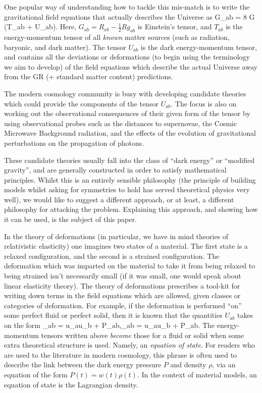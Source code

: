 One popular way of understanding how to tackle this mis-match is to write the gravitational field equations that actually describes the Universe as
\bea
G_{ab} = 8 \pi G \left(T_{ab} + U_{ab}\right).
\eea
Here, $G_{ab} = R_{ab} - \tfrac{1}{2}Rg_{ab}$ is Einstein's tensor, and $T_{ab}$ is the energy-momentum tensor of all \textit{known} matter sources (such as radiation, baryonic, and dark matter).
The tensor $U_{ab}$ is the dark energy-momentum tensor, and contains all the deviations or deformations (to begin using the terminology we aim to develop) of the field equations which describe the actual Universe away from the GR (+ standard matter content) predictions. 

The modern cosmology community is busy with developing candidate theories which could provide the components of the tensor $U_{ab}$. The focus is also on working out the observational consequences of their given form of the tensor by using observational probes such as the distances to supernovae, the Cosmic Microwave Background radiation, and the effects of the evolution of gravitational perturbations on the propagation of photons.  

These candidate theories usually fall into the class of ``dark energy'' or ``modified gravity'', and are generally constructed in order to satisfy mathematical principles. Whilst this is an entirely sensible philosophy (the principle of building models whilst asking for symmetries to hold has served theoretical physics very well), we  would like to suggest a different approach, or at least, a different philosophy for attacking the problem. Explaining this approach, and showing how it can be used, is the subject of this paper.

In the theory of deformations (in particular, we have in mind   theories of relativistic elasticity) one imagines two states of a material. The first state is a relaxed configuration, and the second is a strained configuration. The deformation which was imparted on the material to take it from being relaxed to being strained isn't necessarily small (if it was small, one would  speak about linear elasticity theory). The theory of deformations prescribes a tool-kit for writing down terms in the field equations which are allowed, given classes or categories of deformation. For example, if the deformation is performed ``on'' some perfect fluid or perfect solid, then it is known that the quantities $U_{ab}$ takes on the form
\bea
{}_{ab} = \rho u_au_b + P\gamma_{ab},\qquad {}_{ab} = \rho u_au_b + P_{ab}.
\eea
The energy-momentum tensors written above \textit{become} those for a fluid or solid when some extra theoretical structure is used. Namely, an \textit{equation of state}. For readers who are used to the literature in modern cosmology, this phrase is often used to describe the link between the dark energy pressure $P$ and density $\rho$, via an equation of the form $P(t) = w(t) \rho(t)$. In the context of material models, an equation of state is the Lagrangian density.


